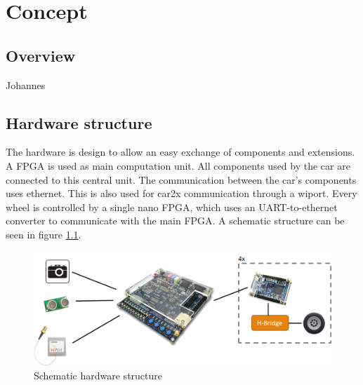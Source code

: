 \chapter{Concept}

\section{Overview}
Johannes

\section{Hardware structure}
The hardware is design to allow an easy exchange of components and extensions. A FPGA is used as main computation unit. All components used by the car are connected to this central unit. The communication between the car's components uses ethernet. This is also used for car2x communication through a wiport. Every wheel is controlled by a single nano FPGA, which uses an UART-to-ethernet converter to communicate with the main FPGA. A schematic structure can be seen in figure \ref{HWconc}.
\begin{center}
\begin{figure}[h]
	\includegraphics[width=\textwidth]{figures/hardwareconcept.png}
	\caption{Schematic hardware structure} \label{HWconc}
\end{figure}
\end{center}

